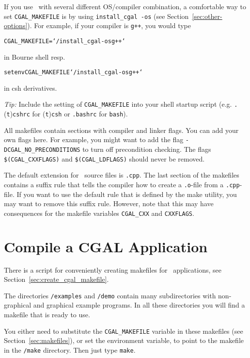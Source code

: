 If you use \cgal\ with several different OS/compiler combination, a
comfortable way to set \texttt{CGAL\_MAKEFILE} is by using
\texttt{install\_cgal~-os} (see Section~\ref{sec:other-options}).  For
example, if your compiler is \texttt{g++}, you would type
\begin{alltt}
CGAL_MAKEFILE=`\yourcgaldir/install_cgal -os g++`
\end{alltt}
in Bourne shell resp.
\begin{alltt}
setenv CGAL_MAKEFILE `\yourcgaldir/install_cgal -os g++`
\end{alltt}
in csh derivatives.

\textit{Tip:} Include the setting of \texttt{CGAL\_MAKEFILE} into your
shell startup script (e.g. \texttt{.}(\texttt{t})\texttt{cshrc} for
(\texttt{t})\texttt{csh} or \texttt{.bashrc} for \texttt{bash}).

All makefiles contain sections with compiler and linker flags.  You
can add your own flags here. For example, you might want to add the
flag \texttt{-DCGAL\_NO\_PRECONDITIONS} to turn off precondition
checking. The flags \texttt{\$(CGAL\_CXXFLAGS)} and
\texttt{\$(CGAL\_LDFLAGS)} should never be removed.

The default extension for \cgal\ source files is \texttt{.cpp}.  The
last section of the makefiles contains a suffix rule that tells the
compiler how to create a \texttt{.o}-file from a \texttt{.cpp}-file.  If
you want to use the default rule that is defined by the make utility,
you may want to remove this suffix rule.  However, note that this may
have consequences for the makefile variables \texttt{CGAL\_CXX} and
\texttt{CXXFLAGS}.

\section{Compile a CGAL Application\label{sec:appl}}

There is a script for conveniently creating makefiles for \cgal\
applications, see Section~\ref{sec:create_cgal_makefile}.

The directories \texttt{\cgaldir/examples} and \texttt{\cgaldir/demo}
contain many subdirectories with non-graphical and graphical example
programs. In all these directories you will find a makefile that is
ready to use.

You either need to substitute the \texttt{CGAL\_MAKEFILE} variable in
these makefiles (see Section~\ref{sec:makefiles}), or set the
environment variable, to point to the makefile in the
\texttt{\cgaldir/make} directory. Then just type \texttt{make}.

